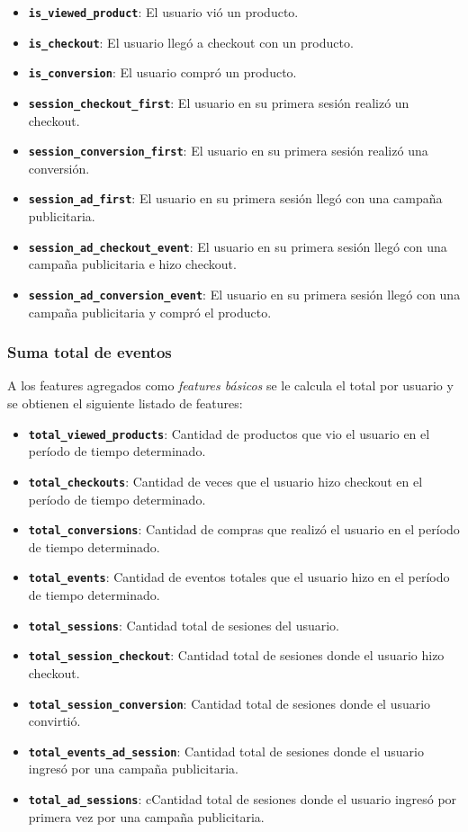 \documentclass[a4paper]{article}
\begin{document}
\begin{itemize}
	\item \textbf{\texttt{is\_viewed\_product}}: El usuario vió un producto.
	\item \textbf{\texttt{is\_checkout}}: El usuario llegó a checkout con un producto.
	\item \textbf{\texttt{is\_conversion}}: El usuario compró un producto.
	\item \textbf{\texttt{session\_checkout\_first}}: El usuario en su primera sesión realizó un checkout.
	\item \textbf{\texttt{session\_conversion\_first}}: El usuario en su primera sesión realizó una conversión.
	\item \textbf{\texttt{session\_ad\_first}}: El usuario en su primera sesión llegó con una campaña publicitaria.
	\item \textbf{\texttt{session\_ad\_checkout\_event}}: El usuario en su primera sesión llegó con una campaña publicitaria e hizo checkout.
	\item \textbf{\texttt{session\_ad\_conversion\_event}}: El usuario en su primera sesión llegó con una campaña publicitaria y compró el producto.
\end{itemize}	
	
\subsubsection{Suma total de eventos}

A los features agregados como \textit{features básicos} se le calcula el total por usuario y se obtienen el siguiente listado de features:
\begin{itemize}
	\item \textbf{\texttt{total\_viewed\_products}}: Cantidad de productos que vio el usuario en el período de tiempo determinado.
	\item \textbf{\texttt{total\_checkouts}}: Cantidad de veces que el usuario hizo checkout en el período de tiempo determinado.
	\item \textbf{\texttt{total\_conversions}}: Cantidad de compras que realizó el usuario en el período de tiempo determinado.
	\item \textbf{\texttt{total\_events}}: Cantidad de eventos totales que el usuario hizo en el período de tiempo determinado.
	\item \textbf{\texttt{total\_sessions}}: Cantidad total de sesiones del usuario.
	\item \textbf{\texttt{total\_session\_checkout}}: Cantidad total de sesiones donde el usuario hizo checkout.
	\item \textbf{\texttt{total\_session\_conversion}}: Cantidad total de sesiones donde el usuario convirtió.
	\item \textbf{\texttt{total\_events\_ad\_session}}: Cantidad total de sesiones donde el usuario ingresó por una campaña publicitaria.
	\item \textbf{\texttt{total\_ad\_sessions}}: cCantidad total de sesiones donde el usuario ingresó por primera vez por una campaña publicitaria.
\end{itemize}
	
\end{document}
